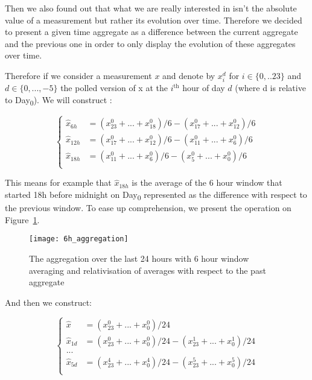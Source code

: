 Then we also found out that what we are really interested in isn't the absolute value of a measurement but rather its evolution over time. Therefore we decided to present a given time aggregate as a difference between the current aggregate and the previous one in order to only display the evolution of these aggregates over time. 

Therefore if we consider a measurement $x$ and denote by $x^d_i$ for $i \in \{0,..23\}$ and $d \in \{0,...,-5\}$  the polled version of x at the $i^\text{th}$ hour of day $d$ (where d is relative to Day\textsubscript{0}). We will construct : 

\begin{equation}
\begin{cases}
	\hat{x}_{6h} &= (x^0_{23}+...+x^0_{18})/6 - (x^0_{17}+...+x^0_{12})/6\\
	\hat{x}_{12h} &= (x^0_{17}+...+x^0_{12})/6 - (x^0_{11}+...+x^0_{6})/6\\
	\hat{x}_{18h} &= (x^0_{11}+...+x^0_{6})/6 - (x^0_{5}+...+x^0_{0})/6\\
\end{cases}
\end{equation}

This means for example that $\hat{x}_{18h}$ is the average of the 6 hour window that started 18h before midnight on Day\textsubscript{0} represented as the difference with respect to the previous window. To ease up comprehension, we present the operation on Figure~\ref{6h_agg}.

\begin{figure}[ht]
    \begin{center}
    \texttt{[image: 6h\_aggregation]}
    \end{center}
    \caption{The aggregation over the last 24 hours with 6 hour window averaging and relativisation of averages with respect to the past aggregate}
    \label{6h_agg}
\end{figure}


And then we construct:

\begin{equation}
\begin{cases}
	\hat{x} &= (x^0_{23}+...+x^0_{0})/24\\
	\hat{x}_{1d} &= (x^0_{23}+...+x^0_{0})/24 - (x^1_{23}+...+x^1_{0})/24\\
	...\\
	\hat{x}_{5d} &= (x^4_{23}+...+x^4_{0})/24 - (x^5_{23}+...+x^5_{0})/24\\
\end{cases}
\end{equation}

